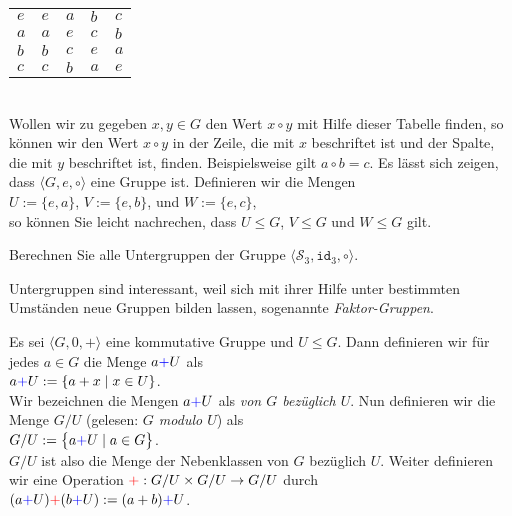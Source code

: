 \begin{enumerate}
\begin{tabular}[t]{l|llll}
      \hline
          $e$ & $e$ & $a$ & $b$ & $c$ \\
          $a$ & $a$ & $e$ & $c$ & $b$ \\
          $b$ & $b$ & $c$ & $e$ & $a$ \\
          $c$ & $c$ & $b$ & $a$ & $e$ \\
      \end{tabular}
      \\[0.2cm]
      Wollen wir zu gegeben $x,y \in G$ den Wert $x \circ y$ mit Hilfe dieser Tabelle finden, so k\"{o}nnen
      wir den Wert $x \circ y$ in der Zeile, die mit $x$ beschriftet ist und der Spalte, die mit $y$
      beschriftet ist, finden.  Beispielsweise gilt $a \circ b = c$.  Es l\"{a}sst sich zeigen, dass
      $\langle G, e, \circ \rangle$ eine Gruppe ist.  Definieren wir die Mengen
      \\[0.2cm]
      \hspace*{1.3cm} $U := \{ e, a \}$, \quad $V := \{ e, b \}$, \quad und \quad $W := \{ e, c \}$, 
      \\[0.2cm]
      so k\"{o}nnen Sie leicht nachrechen, dass 
      $U \leq G$, $V \leq G$ und $W \leq G$ gilt.
      \eoxs
\end{enumerate}

\exercise
Berechnen Sie alle Untergruppen der Gruppe $\langle \mathcal{S}_3, \mathtt{id}_3, \circ \rangle$.
\exend
\vspace*{0.3cm}

Untergruppen sind interessant, weil sich mit ihrer Hilfe unter bestimmten Umst\"{a}nden 
neue Gruppen bilden lassen, sogenannte \emph{\color{blue}Faktor-Gruppen}.

\begin{Definition}
  Es sei $\langle G, 0, + \rangle$ eine {\color{red}kommutative} Gruppe und $U \leq G$.
  Dann definieren wir f\"{u}r jedes $a \in G$ die Menge $a{\color{blue}{+}}U$ als
  \\[0.2cm]
  \hspace*{1.3cm}
  $a {\color{blue}{+}} U := \{ a + x \mid x \in U \}$.
  \\[0.2cm]
  Wir bezeichnen die Mengen $a {\color{blue}{+}} U$ als \emph{\color{blue}{Nebenklassen} von $G$ bez\"{u}glich $U$}.
  Nun definieren wir die Menge \emph{\color{blue}$G/U$} (gelesen: \emph{\color{blue}$G$ modulo $U$}) als
  \\[0.2cm]
  \hspace*{1.3cm}
  $G/U := \bigl\{ a {\color{blue}{+}} U \mid a \in G \bigr\}$.
  \\[0.2cm]
  $G/U$ ist also die Menge der Nebenklassen von $G$ bez\"{u}glich $U$.
  Weiter definieren wir eine Operation ${\color{red}{+}}: G/U \times G/U \rightarrow G/U$ durch
  \\[0.2cm]
  \hspace*{1.3cm}
  $(a {\color{blue}{+}} U) {\color{red}{+}} (b {\color{blue}{+}} U) := (a + b) {\color{blue}{+}} U$.
\end{Definition}

